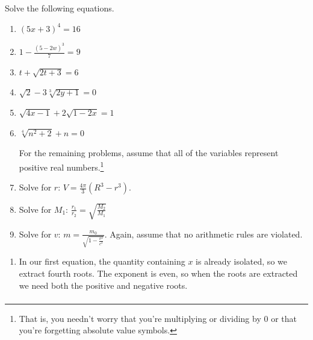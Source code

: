 \documentclass{ximera}
\begin{document}
\begin{example}\label{radicaleqnreview}  Solve the following equations.

\begin{enumerate}

\item  $(5x +3)^{4} = 16$

\item  $1 - \frac{(5-2w)^3}{7} = 9$

\item  $t + \sqrt{2t+3} = 6$

\item $\sqrt{2} - 3\sqrt[3]{2y+1} = 0$ 

\item  $\sqrt{4x-1}  + 2\sqrt{1 - 2x} = 1$

\item  $\sqrt[4]{n^2 + 2} + n = 0$



For the remaining problems, assume that all of the variables represent positive real numbers.\footnote{That is, you needn't worry that you're multiplying or dividing by $0$ or that you're forgetting absolute value symbols.}


\item  Solve for $r$:  $V = \frac{4\pi}{3}(R^3 - r^3)$.

\item  Solve for $M_1$:  $\frac{r_1}{r_2} = \sqrt{\frac{M_2}{M_1}}$



\item  Solve for $v$:  $m = \frac{m_0}{\sqrt{1 - \frac{v^2}{c^2}}}$.  Again, assume that no arithmetic rules are violated.

\end{enumerate}

\begin{explanation}

\begin{enumerate}

\item  In our first equation, the quantity containing $x$ is already isolated, so we extract fourth roots. The exponent is even, so when the roots are extracted we need both the positive and negative roots. \[ \begin{array}{rclr}


\end{array}\]
\end{enumerate}
\end{explanation}
\end{example}
\end{document}
